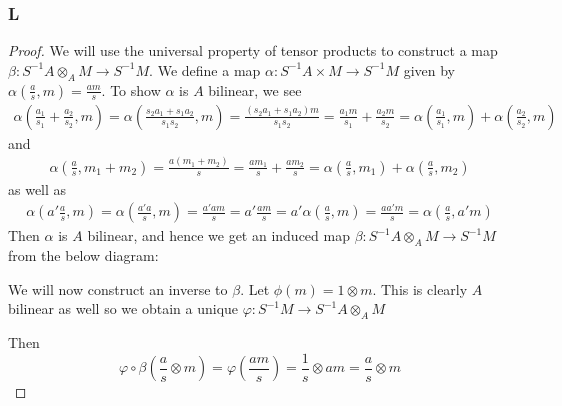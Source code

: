 \documentclass{article}
\begin{document}
\subsubsection{L}\label{1.3.L}
\begin{proof}
    We will use the universal property of tensor products to construct a map $\beta:S^{-1}A\otimes_A M\to S^{-1}M$. We define a map $\alpha:S^{-1}A\times M\to S^{-1}M$ given by $\alpha(\frac{a}{s},m)=\frac{am}{s}$. To show $\alpha$ is $A$ bilinear, we see
    \begin{align*}
        \alpha(\frac{a_1}{s_1}+\frac{a_2}{s_2},m)=\alpha(\frac{s_2a_1+s_1a_2}{s_1s_2},m)=\frac{(s_2a_1+s_1a_2)m}{s_1s_2}=\frac{a_1m}{s_1}+\frac{a_2m}{s_2}=\alpha(\frac{a_1}{s_1},m)+\alpha(\frac{a_2}{s_2},m)
    \end{align*}
    and
    \begin{align*}
        \alpha(\frac{a}{s},m_1+m_2)=\frac{a(m_1+m_2)}{s}=\frac{am_1}{s}+\frac{am_2}{s}=\alpha(\frac{a}{s},m_1)+\alpha(\frac{a}{s},m_2)
    \end{align*}
    as well as
    \begin{align*}
        \alpha(a' \frac{a}{s},m)=\alpha(\frac{a'a}{s},m)=\frac{a'am}{s}=a'\frac{am}{s}=a'\alpha(\frac{a}{s},m)=\frac{aa'm}{s}=\alpha(\frac{a}{s},a'm)
    \end{align*}
    Then $\alpha$ is $A$ bilinear, and hence we get an induced map $\beta:S^{-1}A\otimes_A M\to S^{-1}M$ from the below diagram:
    \begin{center}
    \end{center}
    We will now construct an inverse to $\beta$. Let $\phi(m)=1\otimes m$. This is clearly $A$ bilinear as well so we obtain a unique $\varphi:S^{-1}M\to S^{-1}A\otimes_A M$
    \begin{center}
    \end{center}
    Then
    \[
    \varphi \circ \beta(\frac{a}{s}\otimes m)=\varphi(\frac{am}{s})=\frac{1}{s}\otimes am=\frac{a}{s}\otimes m
\]
\end{proof}
\end{document}
